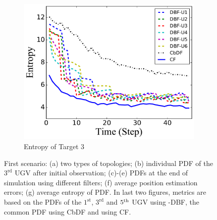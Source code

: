 \begin{figure}
\begin{subfigure}[b]{0.23\textwidth}
			\includegraphics[width=\textwidth]{figures/hetero_mov_sen_mov_tar_entropy_noise_sin}
			\caption{Entropy of Target $3$}\label{fig:sin_ent}
		\end{subfigure}		
		\caption{First scenario: (a) two types of topologies; (b) individual PDF of the $3^\text{rd}$ UGV after initial observation; (c)-(e) PDFs at the end of simulation using different filters; (f) average position estimation errors; (g) average entropy of PDF. In last two figures, metrics are based on the PDFs of the $1^\text{st}$, $3^\text{rd}$ and $5^\text{th}$ UGV using \proto-DBF, the common PDF using CbDF and using CF.}
		\label{fig:metrics}
	\end{figure}
	
